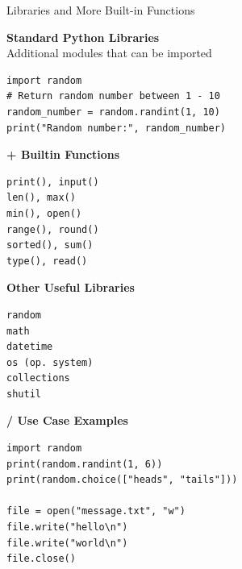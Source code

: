 \documentclass[
	11pt, 
]{beamer}
\begin{document}

\begin{frame}[fragile]{Libraries and More Built-in Functions}
       \small %
    \begin{minipage}[t]{0.7\textwidth} %
    \textbf{Standard Python Libraries}\\
    Additional modules that can be imported
    \begin{verbatim}
import random
# Return random number between 1 - 10
random_number = random.randint(1, 10)
print("Random number:", random_number)
    \end{verbatim}
\end{minipage}
\hfill %
\begin{minipage}[t]{0.29\textwidth} %
    \textbf{+ Builtin Functions}
    \begin{verbatim}
print(), input()
len(), max()
min(), open()
range(), round()
sorted(), sum()
type(), read()
    \end{verbatim}
\end{minipage}

    \vspace{1em} %

    \begin{minipage}[t]{0.35\textwidth}
    \textbf{Other Useful Libraries}
        \begin{verbatim}
random
math
datetime
os (op. system)
collections
shutil
        \end{verbatim}
    \end{minipage}
    \hfill
    \begin{minipage}[t]{0.64\textwidth}
    \textbf{/ Use Case Examples}
        \begin{verbatim}
import random
print(random.randint(1, 6))
print(random.choice(["heads", "tails"]))

file = open("message.txt", "w")
file.write("hello\n")
file.write("world\n")
file.close()

        \end{verbatim}
    \end{minipage}

\end{frame}


\end{document}

